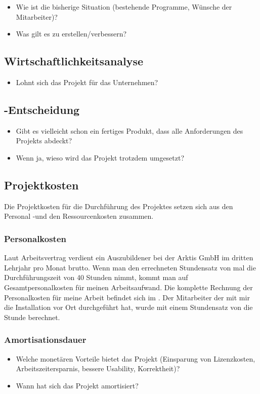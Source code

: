 \begin{itemize}
	\item Wie ist die bisherige Situation (\zB bestehende Programme, Wünsche der Mitarbeiter)?
	\item Was gilt es zu erstellen/verbessern?
\end{itemize}


\subsection{Wirtschaftlichkeitsanalyse}
\label{sec:Wirtschaftlichkeitsanalyse}
\begin{itemize}
	\item Lohnt sich das Projekt für das Unternehmen?
\end{itemize}


\subsection{-Entscheidung}
\label{sec:MakeOrBuyEntscheidung}
\begin{itemize}
	\item Gibt es vielleicht schon ein fertiges Produkt, dass alle Anforderungen des Projekts abdeckt?
	\item Wenn ja, wieso wird das Projekt trotzdem umgesetzt?
\end{itemize}


\subsection{Projektkosten}
\label{sec:Projektkosten}
Die Projektkosten für die Durchführung des Projektes setzen sich aus den Personal -und den Ressourcenkosten zusammen.
\subsubsection{Personalkosten}
Laut Arbeitsvertrag verdient ein Auszubildener bei der Arktis GmbH im dritten Lehrjahr pro Monat  brutto. 
Wenn man den errechneten Stundensatz von  mal die Durchführungszeit von 40 Stunden nimmt, kommt man auf  Gesamtpersonalkosten für meinen Arbeitsaufwand. Die komplette Rechnung der Personalkosten für meine Arbeit befindet sich im . 
Der Mitarbeiter der mit mir die Installation vor Ort durchgeführt hat, wurde mit einem Stundensatz von  die Stunde berechnet.  

\subsubsection{Amortisationsdauer}
\label{sec:Amortisationsdauer}
\begin{itemize}
	\item Welche monetären Vorteile bietet das Projekt (\zB Einsparung von Lizenzkosten, Arbeitszeitersparnis, bessere Usability, Korrektheit)?
	\item Wann hat sich das Projekt amortisiert?
\end{itemize}

